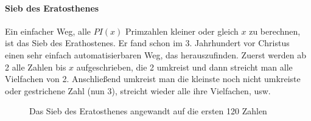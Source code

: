 \begin{refsegment}
\paragraph*{Sieb des Eratosthenes}\mbox{}
\hypertarget{SieveEratosthenes01}{}

Ein einfacher Weg, alle $PI(x)$ Primzahlen kleiner oder gleich $x$
zu berechnen, ist das Sieb des Erathostenes. Er fand schon im 3.
Jahrhundert vor Christus einen sehr einfach automatisierbaren Weg,
das herauszufinden. Zuerst werden ab 2 alle Zahlen bis $x$
aufgeschrieben, die 2 umkreist und dann streicht man alle
Vielfachen von 2. Anschließend umkreist man die kleinste noch
nicht umkreiste oder gestrichene Zahl (nun 3), streicht wieder
alle ihre Vielfachen, usw.

\begin{figure}[!hb]
\begin{center}
 \caption[Das Sieb des Eratosthenes angewandt auf die ersten 120 Zahlen]
         {Das Sieb des Eratosthenes angewandt auf die ersten 120 Zahlen\protect\footnotemark}
\label{SieveEratosthenes01-figure}
\end{center}
\end{figure}


\end{refsegment}
